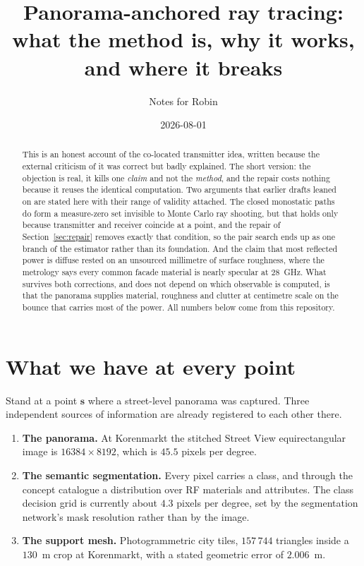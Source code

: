 \documentclass[11pt,a4paper]{article}
\title{Panorama-anchored ray tracing:\\ what the method is, why it works, and where it breaks}
\author{Notes for Robin}
\date{2026-08-01}
\newcommand{\bs}{\mathbf{s}}
\begin{document}
\maketitle

\begin{abstract}
This is an honest account of the co-located transmitter idea, written because the
external criticism of it was correct but badly explained. The short version: the
objection is real, it kills one \emph{claim} and not the \emph{method}, and the
repair costs nothing because it reuses the identical computation. Two arguments
that earlier drafts leaned on are stated here with their range of validity
attached. The closed monostatic paths do form a measure-zero set invisible to
Monte Carlo ray shooting, but that holds only because transmitter and receiver
coincide at a point, and the repair of Section~\ref{sec:repair} removes exactly
that condition, so the pair search ends up as one branch of the estimator rather
than its foundation. And the claim that most reflected power is diffuse rested on
an unsourced millimetre of surface roughness, where the metrology says every
common facade material is nearly specular at $28$~GHz. What survives both
corrections, and does not depend on which observable is computed, is that the
panorama supplies material, roughness and clutter at centimetre scale on the
bounce that carries most of the power. All numbers below come from this
repository.
\end{abstract}

\section{What we have at every point}

Stand at a point $\bs$ where a street-level panorama was captured. Three
independent sources of information are already registered to each other there.

\begin{enumerate}
\item \textbf{The panorama.} At Korenmarkt the stitched Street View equirectangular
      image is $16384\times 8192$, which is $45.5$ pixels per degree.
\item \textbf{The semantic segmentation.} Every pixel carries a class, and through
      the concept catalogue a distribution over RF materials and attributes. The
      class decision grid is currently about $4.3$ pixels per degree, set by the
      segmentation network's mask resolution rather than by the image.
\item \textbf{The support mesh.} Photogrammetric city tiles, $157\,744$ triangles
      inside a $130$~m crop at Korenmarkt, with a stated geometric error of
      $2.006$~m.
\end{enumerate}
\end{document}
